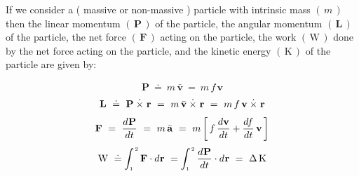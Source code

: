 \documentclass[10pt,fleqn]{article}
\begin{document}
\bigskip \smallskip

\noindent If we consider a ( massive or non-massive ) particle with intrinsic mass $( \, m \, )$ then the linear momentum $( \, \mathbf{P} \, )$ of the particle, the angular momentum $( \, \mathbf{L} \, )$ of the particle, the net force $( \, \mathbf{F} \, )$ acting on the particle, the work $( \, \mathrm{W} \, )$ done by the net force acting on the particle, and the kinetic energy $( \, \mathrm{K} \, )$ of the particle are given by:
\par \vspace{-0.30em}
\begin{eqnarray*}
\mathbf{P} ~\doteq~ m \, \bar{\mathbf{v}} ~=~ m \, f \, \mathbf{v}
\end{eqnarray*}
\vspace{-0.30em}
\begin{eqnarray*}
\mathbf{L} ~\doteq~ \mathbf{P} \hspace{+0.24em}\dot{\times}\hspace{+0.30em} \mathbf{r} ~=~ m \, \bar{\mathbf{v}} \hspace{+0.24em}\dot{\times}\hspace{+0.30em} \mathbf{r} ~=~ m \, f \, \mathbf{v} \hspace{+0.24em}\dot{\times}\hspace{+0.30em} \mathbf{r}
\end{eqnarray*}
\vspace{-0.30em}
\begin{eqnarray*}
\mathbf{F} ~=~ \dfrac{d\hspace{+0.045em}\mathbf{P}}{d\hspace{+0.012em}t} ~=~ m \, \bar{\mathbf{a}} ~=~ m \, \bigg [ \, f \, \dfrac{d\hspace{+0.021em}\mathbf{v}}{d\hspace{+0.012em}t} + \dfrac{d\hspace{-0.12em}f}{d\hspace{+0.012em}t} \, \mathbf{v} \, \bigg ]
\end{eqnarray*}
\vspace{-0.15em}
\begin{eqnarray*}
\mathrm{W} ~\doteq~ \hspace{-0.36em} \int_{\scriptscriptstyle 1}^{\hspace{+0.09em}{\scriptscriptstyle 2}} \mathbf{F} \cdot d\hspace{+0.036em}\mathbf{r} ~=~ \hspace{-0.36em} \int_{\scriptscriptstyle 1}^{\hspace{+0.09em}{\scriptscriptstyle 2}} \dfrac{d\hspace{+0.045em}\mathbf{P}}{d\hspace{+0.012em}t} \cdot d\hspace{+0.036em}\mathbf{r} ~=~ \Delta \, \mathrm{K}
\end{eqnarray*}
\end{document}

